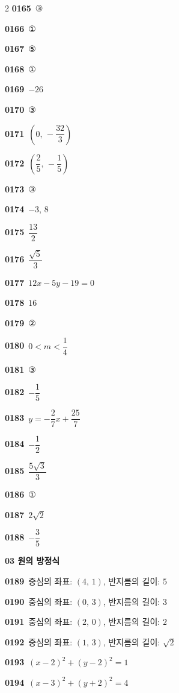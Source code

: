 \documentclass[10pt,a4paper]{article}
\begin{document}
\begin{multicols}{2}
\noindent\textbf{0165}\ ③\par
\noindent\textbf{0166}\ ①\par
\noindent\textbf{0167}\ ⑤\par
\noindent\textbf{0168}\ ①\par
\noindent\textbf{0169}\ $-26$\par
\noindent\textbf{0170}\ ③\par
\noindent\textbf{0171}\ $\left(0,\,-\dfrac{32}{3}\right)$\par
\noindent\textbf{0172}\ $\left(\dfrac{2}{5},\,-\dfrac{1}{5}\right)$\par
\noindent\textbf{0173}\ ③\par
\noindent\textbf{0174}\ $-3$, $8$\par
\noindent\textbf{0175}\ $\dfrac{13}{2}$\par
\noindent\textbf{0176}\ $\dfrac{\sqrt{5}}{3}$\par
\noindent\textbf{0177}\ $12x-5y-19=0$\par
\noindent\textbf{0178}\ $16$\par
\noindent\textbf{0179}\ ②\par
\noindent\textbf{0180}\ $0<m<\dfrac{1}{4}$\par
\noindent\textbf{0181}\ ③\par
\noindent\textbf{0182}\ $-\dfrac{1}{5}$\par
\noindent\textbf{0183}\ $y=-\dfrac{2}{7}x+\dfrac{25}{7}$\par
\noindent\textbf{0184}\ $-\dfrac{1}{2}$\par
\noindent\textbf{0185}\ $\dfrac{5\sqrt{3}}{3}$\par
\noindent\textbf{0186}\ ①\par
\noindent\textbf{0187}\ $2\sqrt{2}$\par
\noindent\textbf{0188}\ $-\dfrac{3}{5}$\par
\noindent\textbf{03 원의 방정식}\par\smallskip
\noindent\textbf{0189}\ 중심의 좌표: $(4,\,1)$, 반지름의 길이: $5$\par
\noindent\textbf{0190}\ 중심의 좌표: $(0,\,3)$, 반지름의 길이: $3$\par
\noindent\textbf{0191}\ 중심의 좌표: $(2,\,0)$, 반지름의 길이: $2$\par
\noindent\textbf{0192}\ 중심의 좌표: $(1,\,3)$, 반지름의 길이: $\sqrt{2}$\par
\noindent\textbf{0193}\ $(x-2)^2+(y-2)^2=1$\par
\noindent\textbf{0194}\ $(x-3)^2+(y+2)^2=4$\par

\end{multicols}
\end{document}
